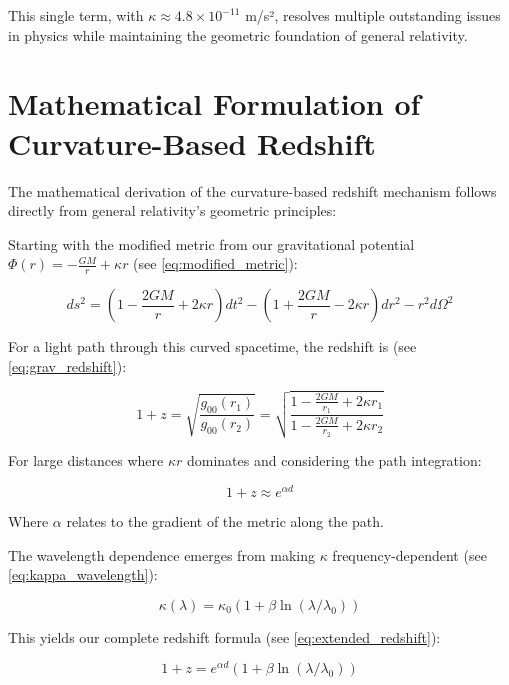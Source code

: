\documentclass[12pt,a4paper]{article}
\begin{document}
	This single term, with $\kappa \approx 4.8\times10^{-11}$ m/s², resolves multiple outstanding issues in physics while maintaining the geometric foundation of general relativity.
	
	\section{Mathematical Formulation of Curvature-Based Redshift}
	\label{sec:math_formulation}
	
	The mathematical derivation of the curvature-based redshift mechanism follows directly from general relativity's geometric principles\cite{weinberg1972}:
	
	Starting with the modified metric from our gravitational potential $\Phi(r) = -\frac{GM}{r} + \kappa r$ (see \cref{eq:modified_metric}):
	
	\begin{equation}
		ds^2 = (1 - \frac{2GM}{r} + 2\kappa r)dt^2 - (1 + \frac{2GM}{r} - 2\kappa r)dr^2 - r^2d\Omega^2
	\end{equation}
	
	For a light path through this curved spacetime, the redshift is (see \cref{eq:grav_redshift}):
	
	\begin{equation}
		1 + z = \sqrt{\frac{g_{00}(r_1)}{g_{00}(r_2)}} = \sqrt{\frac{1 - \frac{2GM}{r_1} + 2\kappa r_1}{1 - \frac{2GM}{r_2} + 2\kappa r_2}}
	\end{equation}
	
	For large distances where $\kappa r$ dominates and considering the path integration\cite{pascher_messdifferenzen_2025}:
	
	\begin{equation}
		\label{eq:base_redshift}
		1 + z \approx e^{\alpha d}
	\end{equation}
	
	Where $\alpha$ relates to the gradient of the metric along the path.
	
	The wavelength dependence emerges from making $\kappa$ frequency-dependent (see \cref{eq:kappa_wavelength}):
	
	\begin{equation}
		\kappa(\lambda) = \kappa_0(1 + \beta \ln(\lambda/\lambda_0))
	\end{equation}
	
	This yields our complete redshift formula (see \cref{eq:extended_redshift}):
	
	\begin{equation}
		1 + z = e^{\alpha d}(1 + \beta \ln(\lambda/\lambda_0))
	\end{equation}
	
\end{document}
